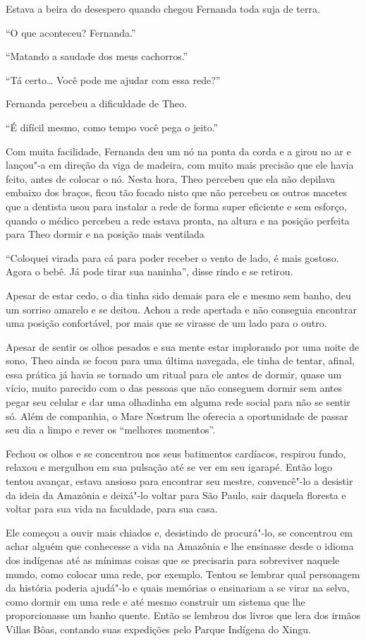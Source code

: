 Estava a beira do desespero quando chegou Fernanda toda suja de terra.

``O que aconteceu? Fernanda.''

``Matando a saudade dos meus cachorros.''

``Tá certo\ldots{} Você pode me ajudar com essa rede?''

Fernanda percebeu a dificuldade de Theo.

``É difícil mesmo, como tempo você pega o jeito.''

Com muita facilidade, Fernanda deu um nó na ponta da corda e a girou
no ar e lançou"-a em direção da viga de madeira, com muito mais precisão
que ele havia feito, antes de colocar o nó. Nesta hora, Theo percebeu
que ela não depilava embaixo dos braços, ficou tão focado nisto que não
percebeu os outros macetes que a dentista usou para instalar a rede
de forma super eficiente e sem esforço, quando o médico percebeu a rede
estava pronta, na altura e na posição perfeita para Theo dormir e na
posição mais ventilada

``Coloquei virada para cá para poder receber o vento de lado, é mais
gostoso. Agora o bebê. Já pode tirar sua naninha'', disse rindo e se
retirou.

Apesar de estar cedo, o dia tinha sido demais para ele e mesmo sem
banho, deu um sorriso amarelo e se deitou. Achou a rede apertada e não
conseguia encontrar uma posição confortável, por mais que se virasse de
um lado para o outro.

Apesar de sentir os olhos pesados e sua mente estar implorando por uma
noite de sono, Theo ainda se focou para uma última navegada, ele tinha
de tentar, afinal, essa prática já havia se tornado um ritual para ele
antes de dormir, quase um vício, muito parecido com o das pessoas que
não conseguem dormir sem antes pegar seu celular e dar uma olhadinha em
alguma rede social para não se sentir só. Além de companhia, o Mare
Nostrum lhe oferecia a oportunidade de passar seu dia a limpo e rever os
``melhores momentos''.

Fechou os olhos e se concentrou nos seus batimentos cardíacos, respirou
fundo, relaxou e mergulhou em sua pulsação até se ver em seu igarapé.
Então logo tentou avançar, estava ansioso para encontrar seu mestre,
convencê"-lo a desistir da ideia da Amazônia e deixá"-lo voltar para São
Paulo, sair daquela floresta e voltar para sua vida na faculdade, para
sua casa.

Ele começou a ouvir mais chiados e, desistindo de procurá"-lo, se
concentrou em achar alguém que conhecesse a vida na Amazônia e lhe
ensinasse desde o idioma dos indígenas até as mínimas coisas que se
precisaria para sobreviver naquele mundo, como colocar uma rede, por
exemplo. Tentou se lembrar qual personagem da história poderia ajudá"-lo
e quais memórias o ensinariam a se virar na selva, como dormir em uma
rede e até mesmo construir um sistema que lhe proporcionasse um banho
quente. Então se lembrou dos livros que lera dos irmãos Villas Bôas,
contando suas expedições pelo Parque Indígena do Xingu.

